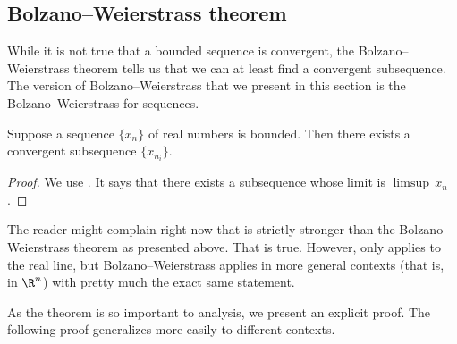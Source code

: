 \documentclass[12pt]{book}
\begin{document}
\subsection*{Bolzano--Weierstrass theorem}

While it is not true that a bounded sequence is convergent, the
Bolzano--Weierstrass theorem tells us that we can at least find a convergent
subsequence.
The version of Bolzano--Weierstrass 
that we present in this section is the Bolzano--Weierstrass for
sequences.

\begin{thm}\label{thm:bwseq}
Suppose a sequence $\{ x_n \}$ of real numbers is bounded.
Then there exists a convergent subsequence $\{ x_{n_i} \}$.
\end{thm}

\begin{proof}
We use .
It says that there exists
a subsequence whose limit is $\limsup \, x_n$.
\end{proof}

The reader might complain right now that 
 is strictly stronger than the
Bolzano--Weierstrass theorem as presented above.
That is true.
However, 
 only applies to the real line, but
Bolzano--Weierstrass applies in more general contexts (that is, in $\R^n$)
with pretty much the exact same statement.

As the theorem is so important to analysis, we present an explicit
proof.
The following proof generalizes more easily to different contexts.
\end{document}
